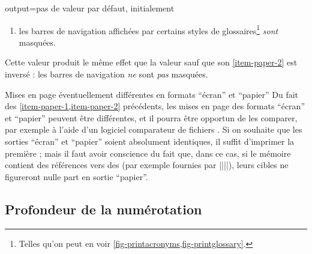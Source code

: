 \begin{docKey}{output}{=\textbar{}\textbar{}}{pas
    de valeur par défaut, initialement }
\begin{description}
\begin{enumerate}
\begin{enumerate}
      \end{enumerate}
    \item%
      \label{item-paper-2}%
      les barres de navigation affichées par certains styles de
      glossaires\footnote{Telles qu'on peut en voir
        \vref{fig-printacronyms,fig-printglossary}.} \emph{sont} masquées.
    \end{enumerate}
  \item[\docValue{paper*}.]%
    Cette valeur produit le même effet que la valeur  sauf que
    son \vref{item-paper-2} est inversé : les barres de navigation \emph{ne}
    sont \emph{pas} masquées.
  \end{description}
\end{docKey}

\begin{dbwarning}{Mises en page éventuellement différentes en formats
    \enquote{écran} et \enquote{papier}}{}
  Du fait des \cref{item-paper-1,item-paper-2} précédents, les mises en page des
  formats \enquote{écran} et \enquote{papier} peuvent être différentes, et il
  pourra être opportun de les comparer, par exemple à l'aide d'un logiciel
  comparateur de fichiers . Si on souhaite que les sorties
  \enquote{écran} et \enquote{papier} soient absolument identiques, il suffit
  d'imprimer la première ; mais il faut avoir conscience du fait que, dans ce
  cas, si le mémoire contient des références vers des  (par
  exemple fournies par
  |\href{|\meta{\normalfont\ttfamily\glsxtrshort*{url}}|}{||}|), leurs
  cibles ne figureront nulle part en sortie \enquote{papier}.
\end{dbwarning}

\subsection{Profondeur de la numérotation}\label{sec-profondeur-de-la}
%
%

